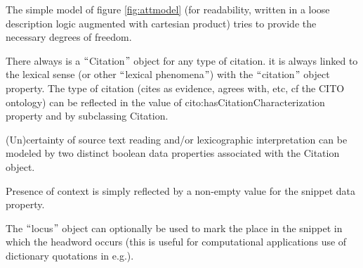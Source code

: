 \documentclass[10pt]{article}
\let\tempone\itemize
\let\temptwo\enditemize
\renewenvironment{itemize}{\tempone\setlength\itemsep{-0.5pt}}{\temptwo}
\begin{document}
 
 \begin{minipage}{\textwidth}
  The  simple model of figure \ref{fig:attmodel} (for readability, written in a loose description logic augmented with cartesian product) tries to provide the necessary degrees of freedom.
 \begin{itemize}
     \item 
 There always is a $``$Citation$"$  object for any type of citation. it is always linked to the lexical sense (or other $``$lexical phenomena$"$) with the $``$citation$"$  object property. The type of citation (cites as evidence, agrees with, etc, cf the CITO ontology\footnotemark{}) can be reflected in the value of cito:hasCitationCharacterization property and by subclassing Citation. \par

\item  (Un)certainty of source text reading and/or lexicographic interpretation can be modeled by two distinct boolean data properties associated with the Citation object. \par

 \item Presence of context is simply reflected by a non-empty value for the snippet data property.\par

 \item The $``$locus$"$  object can optionally be used to mark the place in the snippet in which the headword occurs (this is useful for computational applications use of dictionary quotations in e.g.).\par
 \end{itemize}
\end{minipage}
\end{document}
